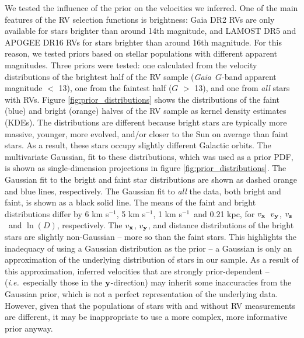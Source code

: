 \documentclass[]{aastex631}
\newcommand{\ie}{{\it i.e.}}
\newcommand{\gaia}{{\it Gaia}}
\newcommand{\vx}{$v_{\bf x}$}
\newcommand{\vy}{$v_{\bf y}$}
\newcommand{\vz}{$v_{\bf z}$}
\newcommand{\y}{${\bf y}$}
\newcommand{\kms}{km s$^{-1}$}
\begin{document}
We tested the influence of the prior on the velocities we inferred.
One of the main features of the RV selection functions is brightness: Gaia DR2
RVs are only available for stars brighter than around 14th magnitude, and
LAMOST DR5 and APOGEE DR16 RVs for stars brighter than around 16th magnitude.
For this reason, we tested priors based on stellar populations with different
apparent magnitudes.
Three priors were tested: one calculated from the velocity distributions of
the brightest half of the RV sample (\gaia\ $G$-band apparent magnitude $<$
13), one from the faintest half ($G$ $>$ 13), and one from {\it all} stars
with RVs.
Figure \ref{fig:prior_distributions} shows the distributions of the faint
(blue) and bright (orange) halves of the RV sample as kernel density estimates
(KDEs).
The distributions are different because bright stars are typically more
massive, younger, more evolved, and/or closer to the Sun on average than faint
stars.
As a result, these stars occupy slightly different Galactic orbits.
The multivariate Gaussian, fit to these distributions, which was used as a
prior PDF, is shown as single-dimension projections in figure
\ref{fig:prior_distributions}.
The Gaussian fit to the bright and faint star distributions are shown as
dashed orange and blue lines, respectively.
The Gaussian fit to {\it all} the data, both bright and faint, is shown as a
black solid line.
The means of the faint and bright distributions differ by 6 \kms, 5 \kms, 1
\kms\ and 0.21 kpc, for \vx\, \vy, \vz\ and $\ln(D)$, respectively.
The \vx, \vy, and distance distributions of the bright stars are slightly
non-Gaussian -- more so than the faint stars.
This highlights the inadequacy of using a Gaussian distribution as the prior
-- a Gaussian is only an approximation of the underlying distribution of stars
in our sample.
As a result of this approximation, inferred velocities that are strongly
prior-dependent -- (\ie\ especially those in the \y-direction) may inherit
some inaccuracies from the Gaussian prior, which is not a perfect
representation of the underlying data.
However, given that the populations of stars with and without RV measurements
are different, it may be inappropriate to use a more complex, more
informative prior anyway.
\end{document}
